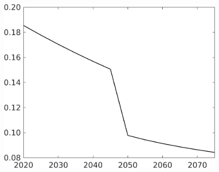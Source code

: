 \documentclass[12pt]{article}
\begin{document}
\begin{figure}[h!!]
\begin{minipage}[]{0.32\textwidth}
\end{minipage}		
\begin{minipage}[]{0.32\textwidth}
\includegraphics[width=1\textwidth]{../../codding_model/own_basedOnFried/optimalPol_010922_revision/figures/all_13Sept22/CompTaufPER_bytaul_Reg0_EY_spillover0_nsk0_xgr0_knspil0_sep0_LFlimit1_emsbase0_countec0_GovRev0_etaa0.79_lgd0.png}
\end{minipage}	
\end{figure}
\end{document}
